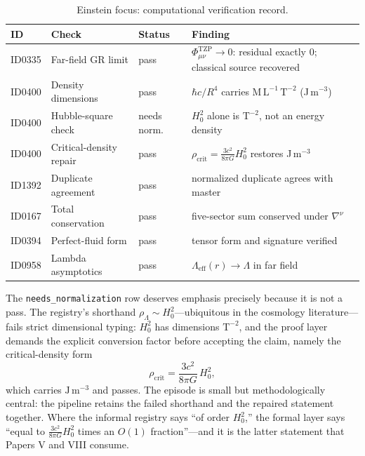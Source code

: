 \documentclass[11pt]{article}
\theoremstyle{remark}
\begin{document}
\begin{table}[H]
\centering
\small
\caption{Einstein focus: computational verification record.}
\label{tab:wolfram}
\begin{tabularx}{\textwidth}{@{}l>{\raggedright\arraybackslash}p{3.25cm}lX@{}}
\toprule
ID & Check & Status & Finding \\
\midrule
ID0335 & Far-field GR limit & pass & $\Phi^{\mathrm{TZP}}_{\mu\nu} \to 0$: residual exactly $0$; classical source recovered \\
ID0400 & Density dimensions & pass & $\hbar c/R^4$ carries $\mathrm{M\,L^{-1}\,T^{-2}}$ (J\,m$^{-3}$) \\
ID0400 & Hubble-square check & needs norm. & $H_0^2$ alone is $\mathrm{T^{-2}}$, not an energy density \\
ID0400 & Critical-density repair & pass & $\rho_{\mathrm{crit}} = \frac{3c^2}{8\pi G} H_0^2$ restores J\,m$^{-3}$ \\
ID1392 & Duplicate agreement & pass & normalized duplicate agrees with master \\
ID0167 & Total conservation & pass & five-sector sum conserved under $\nabla^\nu$ \\
ID0394 & Perfect-fluid form & pass & tensor form and signature verified \\
ID0958 & Lambda asymptotics & pass & $\Lambda_{\mathrm{eff}}(r) \to \Lambda$ in far field \\
\bottomrule
\end{tabularx}
\end{table}

The \texttt{needs\_normalization} row deserves emphasis precisely because it is not a pass. The registry's shorthand $\rho_\Lambda \sim H_0^2$---ubiquitous in the cosmology literature---fails strict dimensional typing: $H_0^2$ has dimensions $\mathrm{T^{-2}}$, and the proof layer demands the explicit conversion factor before accepting the claim, namely the critical-density form
\begin{equation}
\rho_{\mathrm{crit}} = \frac{3 c^2}{8\pi G}\, H_0^2,
\label{eq:critdensity}
\end{equation}
which carries $\mathrm{J\,m^{-3}}$ and passes. The episode is small but methodologically central: the pipeline retains the failed shorthand and the repaired statement together. Where the informal registry says ``of order $H_0^2$,'' the formal layer says ``equal to $\frac{3c^2}{8\pi G}H_0^2$ times an $O(1)$ fraction''---and it is the latter statement that Papers V and VIII consume.
\end{document}
